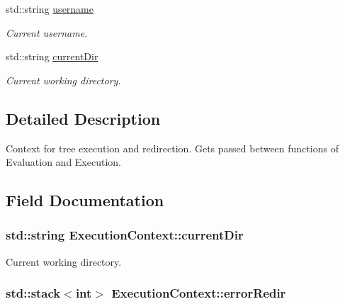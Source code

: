 \begin{DoxyCompactItemize}
std\+::string \hyperlink{structExecutionContext_a6c1bbd4dcfc82e4902c4382af69ab6d9}{username}
\begin{DoxyCompactList}\small\item\em Current username. \end{DoxyCompactList}\item 
std\+::string \hyperlink{structExecutionContext_ad3a0ccfbff4fe1b7b0f5ced3a58dca32}{current\+Dir}
\begin{DoxyCompactList}\small\item\em Current working directory. \end{DoxyCompactList}\end{DoxyCompactItemize}


\subsection{Detailed Description}
Context for tree execution and redirection. Gets passed between functions of Evaluation and Execution. 

\subsection{Field Documentation}
\subsubsection[{\texorpdfstring{current\+Dir}{currentDir}}]{\setlength{\rightskip}{0pt plus 5cm}std\+::string Execution\+Context\+::current\+Dir}\hypertarget{structExecutionContext_ad3a0ccfbff4fe1b7b0f5ced3a58dca32}{}\label{structExecutionContext_ad3a0ccfbff4fe1b7b0f5ced3a58dca32}


Current working directory. 

\subsubsection[{\texorpdfstring{error\+Redir}{errorRedir}}]{\setlength{\rightskip}{0pt plus 5cm}std\+::stack$<$int$>$ Execution\+Context\+::error\+Redir}\hypertarget{structExecutionContext_aa5d29389a31755f8a0c1099f7c7768bf}{}\label{structExecutionContext_aa5d29389a31755f8a0c1099f7c7768bf}


